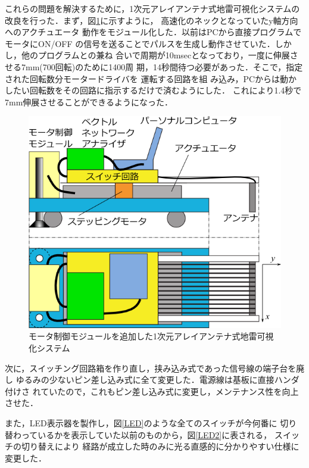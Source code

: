 ﻿\documentclass[12pt,oneside]{jsbook}
\begin{document}
これらの問題を解決するために，1次元アレイアンテナ式地雷可視化システムの
改良を行った．まず，図\ref{so2-2}に示すように，
高速化のネックとなっていたy軸方向へのアクチュエータ
動作をモジュール化した．以前はPCから直接プログラムでモータにON/OFF
の信号を送ることでパルスを生成し動作させていた．しかし，他のプログラムとの兼ね
合いで周期が10msecとなっており，一度に伸展させる7mm(700回転)のために1400周
期，14秒間待つ必要があった．そこで，指定された回転数分モータードライバを
運転する回路を組
み込み，PCからは動かしたい回転数をその回路に指示するだけで済むようにした．
これにより1.4秒で7mm伸展させることができるようになった．

\begin{figure}[btp]
 \begin{center}
\includegraphics[width =0.6\hsize ]{so2-2.png}
\caption{モータ制御モジュールを追加した1次元アレイアンテナ式地雷可視化システム}
\label{so2-2}
  \end{center}
\end{figure}

次に，スイッチング回路箱を作り直し，挟み込み式であった信号線の端子台を廃し
ゆるみの少ないピン差し込み式に全て変更した．電源線は基板に直接ハンダ付けさ
れていたので，これもピン差し込み式に変更し，メンテナンス性を向上させた．

また，LED表示器を製作し，図\ref{LED}のような全てのスイッチが今何番に
切り替わっているかを表示していた以前のものから，図\ref{LED2}に表される，
スイッチの切り替えにより
経路が成立した時のみに光る直感的に分かりやすい仕様に変更した．
\end{document}
